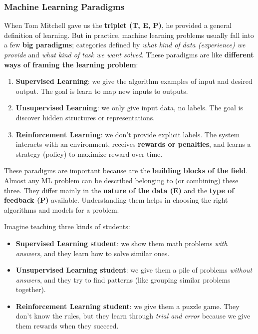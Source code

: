 \subsubsection{Machine Learning Paradigms}\label{sec:machine-learning-paradigms}

When Tom Mitchell gave us the \textbf{triplet (T, E, P)}, he provided a general definition of learning. But in practice, machine learning problems usually fall into a few \textbf{big paradigms}; categories defined by \emph{what kind of data (experience) we provide} and \emph{what kind of task we want solved}. These paradigms are like \textbf{different ways of framing the learning problem}:
\begin{enumerate}
    \item \textbf{Supervised Learning}: we give the algorithm examples of input and desired output. The goal is learn to map new inputs to outputs.
    \item \textbf{Unsupervised Learning}: we only give input data, no labels. The goal is discover hidden structures or representations.
    \item \textbf{Reinforcement Learning}: we don't provide explicit labels. The system interacts with an environment, receives \textbf{rewards or penalties}, and learns a strategy (policy) to maximize reward over time.
\end{enumerate}
These paradigms are important because are the \textbf{building blocks of the field}. Almost any ML problem can be described belonging to (or combining) these three. They differ mainly in the \textbf{nature of the data (E)} and the \textbf{type of feedback (P)} available. Understanding them helps in choosing the right algorithms and models for a problem.

\begin{examplebox}[: Analogy]
    Imagine teaching three kinds of students:
    \begin{itemize}
        \item \textbf{Supervised Learning student}: we show them math problems \emph{with answers}, and they learn how to solve similar ones.
        \item \textbf{Unsupervised Learning student}: we give them a pile of problems \emph{without answers}, and they try to find patterns (like grouping similar problems together).
        \item \textbf{Reinforcement Learning student}: we give them a puzzle game. They don't know the rules, but they learn through \emph{trial and error} because we give them rewards when they succeed.
    \end{itemize}
\end{examplebox}